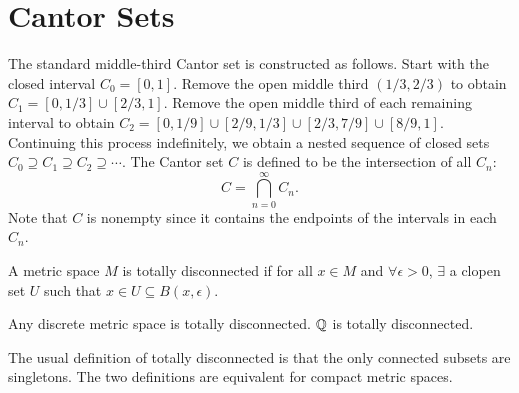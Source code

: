 \chapter{Cantor Sets}

The standard middle-third Cantor set is constructed as follows. Start with the closed interval $C_0 = [0, 1]$. Remove the open middle third $(1/3, 2/3)$ to obtain $C_1 = [0, 1/3] \cup [2/3, 1]$. Remove the open middle third of each remaining interval to obtain $C_2 = [0, 1/9] \cup [2/9, 1/3] \cup [2/3, 7/9] \cup [8/9, 1]$. Continuing this process indefinitely, we obtain a nested sequence of closed sets $C_0 \supseteq C_1 \supseteq C_2 \supseteq \cdots$. The Cantor set $C$ is defined to be the intersection of all $C_n$:
\[
C = \bigcap_{n=0}^\infty C_n.
\]
Note that $C$ is nonempty since it contains the endpoints of the intervals in each $C_n$.

\begin{df}
    A metric space $M$ is totally disconnected if for all $x \in M$ and $\forall \epsilon > 0$, $\exists$ a clopen set $U$ such that $x \in U \subseteq B(x, \epsilon)$.
\end{df}

\begin{ex}
    Any discrete metric space is totally disconnected. ${\mathbb Q}$ is totally disconnected. 
\end{ex}

\begin{rmk}
    The usual definition of totally disconnected is that the only connected subsets are singletons. The two definitions are equivalent for compact metric spaces.
\end{rmk}

